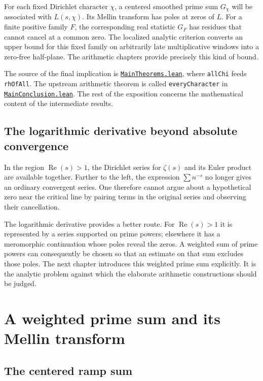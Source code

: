 \documentclass[11pt,openany,oneside]{scrbook}
\theoremstyle{definition}
\theoremstyle{remark}
\newcommand{\Rea}{\operatorname{Re}}
\newcommand{\baseurl}{https://github.com/CocoSgt/riemann-hypothesis-lean/blob/7cbf7a0c32fca1badf05931879a37c3f8a2b03b4/}
\newcommand{\sourcefile}[2]{\href{\baseurl#1}{\texttt{#2}}}
\begin{document}
For each fixed Dirichlet character $\chi$, a centered smoothed prime sum $G_\chi$ will be associated with $L(s,\chi)$. Its Mellin transform has poles at zeros of $L$. For a finite positive family $F$, the corresponding real statistic $G_F$ has residues that cannot cancel at a common zero. The localized analytic criterion converts an upper bound for this fixed family on arbitrarily late multiplicative windows into a zero-free half-plane. The arithmetic chapters provide precisely this kind of bound.

The source of the final implication is \sourcefile{src/Supplements/Kernels/MainTheorems.lean}{MainTheorems.lean}, where \texttt{allChi} feeds \texttt{rhOfAll}. The upstream arithmetic theorem is called \texttt{everyCharacter} in \sourcefile{src/Development/AutomorphicArithmetic/CharacterBoxes/MainConclusion.lean}{MainConclusion.lean}. The rest of the exposition concerns the mathematical content of the intermediate results.

\section{The logarithmic derivative beyond absolute convergence}
In the region $\Rea(s)>1$, the Dirichlet series for $\zeta(s)$ and its Euler product are available together. Farther to the left, the expression $\sum n^{-s}$ no longer gives an ordinary convergent series. One therefore cannot argue about a hypothetical zero near the critical line by pairing terms in the original series and observing their cancellation.

The logarithmic derivative provides a better route. For $\Rea(s)>1$ it is represented by a series supported on prime powers; elsewhere it has a meromorphic continuation whose poles reveal the zeros. A weighted sum of prime powers can consequently be chosen so that an estimate on that sum excludes those poles. The next chapter introduces this weighted prime sum explicitly. It is the analytic problem against which the elaborate arithmetic constructions should be judged.

\chapter{A weighted prime sum and its Mellin transform}\label{ch:statistic}

\section{The centered ramp sum}
\end{document}
